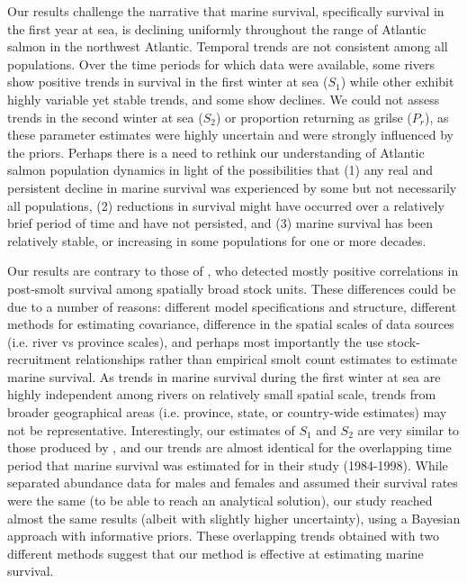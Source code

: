 \documentclass[12pt]{article}
\newcommand{\So}{$S_{1}$\xspace}
\newcommand{\St}{$S_{2}$\xspace}
\newcommand{\Pg}{$P_r$\xspace}
\begin{document}
Our results challenge the narrative that marine survival, specifically survival in the first year at sea, is declining
uniformly throughout the range of Atlantic salmon in the northwest Atlantic.
Temporal trends are not consistent among all populations. 
Over the time periods for which data were available, some rivers show positive trends in survival in the
first winter at sea (\So) while other exhibit highly variable yet stable trends, and some show
declines. We could not assess trends in the second winter at sea (\St) or
proportion returning as grilse (\Pg), as these parameter estimates were highly
uncertain and were strongly influenced by the priors.
Perhaps there is a need to rethink our understanding of Atlantic salmon
population dynamics in light of the possibilities that (1) any real and persistent decline in marine survival was
experienced by some but not necessarily all populations, (2) reductions in survival might
have occurred over a relatively brief period of time and have not persisted, and (3) marine survival has
been relatively stable, or increasing in some populations for one or more decades.

Our results are contrary to those of \citet{Olmos2019}, who detected mostly positive
correlations in post-smolt survival among spatially broad stock units. These differences
could be due to a number of reasons: different model specifications and
structure, different methods for estimating covariance, difference in the
spatial scales of data sources (i.e. river vs province scales), and perhaps most importantly the use stock-recruitment relationships
rather than empirical smolt count estimates to estimate marine survival.
As trends in marine survival during the first winter at sea are highly independent
among rivers on relatively small spatial scale, trends from broader
geographical areas (i.e. province, state, or country-wide estimates) may not
be representative.
Interestingly, our estimates of \So and \St are very similar to those produced
by \citet{Chaput2003b}, and our trends are almost identical for the
overlapping time period that marine survival was estimated for in their study
(1984-1998). 
While \citet{Chaput2003b} separated abundance data for males and females
and assumed their survival rates were the same (to be able to reach an
analytical solution), our study reached almost the same results (albeit with
slightly higher uncertainty), using a Bayesian approach with informative
priors. These overlapping trends obtained with two different methods 
suggest that our method is effective at estimating marine survival.
\end{document}
